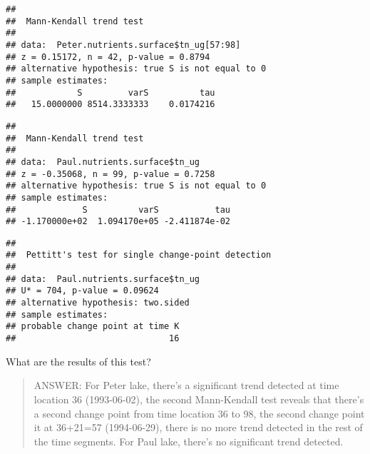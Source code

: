 \documentclass[]{article}
\newenvironment{Shaded}{\begin{snugshade}}{\end{snugshade}}
\newcommand{\KeywordTok}[1]{\textcolor[rgb]{0.13,0.29,0.53}{\textbf{#1}}}
\newcommand{\CommentTok}[1]{\textcolor[rgb]{0.56,0.35,0.01}{\textit{#1}}}
\newcommand{\OperatorTok}[1]{\textcolor[rgb]{0.81,0.36,0.00}{\textbf{#1}}}
\newcommand{\NormalTok}[1]{#1}
\begin{document}
\begin{verbatim}
## 
##  Mann-Kendall trend test
## 
## data:  Peter.nutrients.surface$tn_ug[57:98]
## z = 0.15172, n = 42, p-value = 0.8794
## alternative hypothesis: true S is not equal to 0
## sample estimates:
##            S         varS          tau 
##   15.0000000 8514.3333333    0.0174216
\end{verbatim}

\begin{Shaded}
\end{Shaded}

\begin{verbatim}
## 
##  Mann-Kendall trend test
## 
## data:  Paul.nutrients.surface$tn_ug
## z = -0.35068, n = 99, p-value = 0.7258
## alternative hypothesis: true S is not equal to 0
## sample estimates:
##             S          varS           tau 
## -1.170000e+02  1.094170e+05 -2.411874e-02
\end{verbatim}

\begin{Shaded}
\end{Shaded}

\begin{verbatim}
## 
##  Pettitt's test for single change-point detection
## 
## data:  Paul.nutrients.surface$tn_ug
## U* = 704, p-value = 0.09624
## alternative hypothesis: two.sided
## sample estimates:
## probable change point at time K 
##                              16
\end{verbatim}

What are the results of this test?

\begin{quote}
ANSWER: For Peter lake, there's a significant trend detected at time
location 36 (1993-06-02), the second Mann-Kendall test reveals that
there's a second change point from time location 36 to 98, the second
change point it at 36+21=57 (1994-06-29), there is no more trend
detected in the rest of the time segments. For Paul lake, there's no
significant trend detected.
\end{quote}
\end{document}
